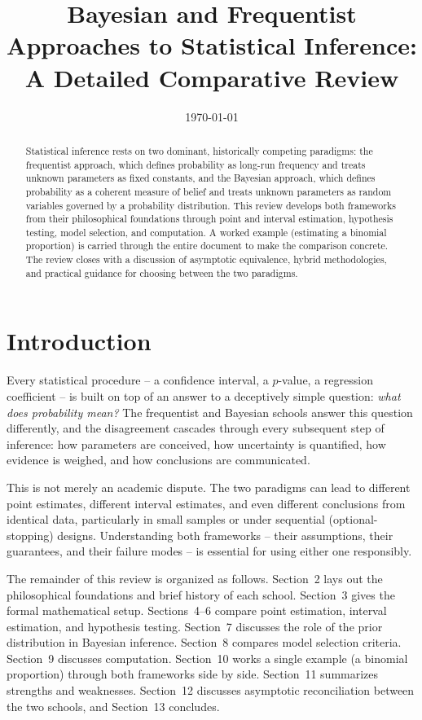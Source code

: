 \documentclass[11pt,a4paper]{article}
\title{\textbf{Bayesian and Frequentist Approaches to Statistical Inference:\\ A Detailed Comparative Review}}
\author{}
\date{\today}
\begin{document}
\maketitle

\begin{abstract}
\noindent Statistical inference rests on two dominant, historically competing paradigms: the frequentist approach, which defines probability as long-run frequency and treats unknown parameters as fixed constants, and the Bayesian approach, which defines probability as a coherent measure of belief and treats unknown parameters as random variables governed by a probability distribution. This review develops both frameworks from their philosophical foundations through point and interval estimation, hypothesis testing, model selection, and computation. A worked example (estimating a binomial proportion) is carried through the entire document to make the comparison concrete. The review closes with a discussion of asymptotic equivalence, hybrid methodologies, and practical guidance for choosing between the two paradigms.
\end{abstract}

\tableofcontents

\section{Introduction}
Every statistical procedure -- a confidence interval, a $p$-value, a regression coefficient -- is built on top of an answer to a deceptively simple question: \emph{what does probability mean?} The frequentist and Bayesian schools answer this question differently, and the disagreement cascades through every subsequent step of inference: how parameters are conceived, how uncertainty is quantified, how evidence is weighed, and how conclusions are communicated.

This is not merely an academic dispute. The two paradigms can lead to different point estimates, different interval estimates, and even different conclusions from identical data, particularly in small samples or under sequential (optional-stopping) designs. Understanding both frameworks -- their assumptions, their guarantees, and their failure modes -- is essential for using either one responsibly.

The remainder of this review is organized as follows. Section~2 lays out the philosophical foundations and brief history of each school. Section~3 gives the formal mathematical setup. Sections~4--6 compare point estimation, interval estimation, and hypothesis testing. Section~7 discusses the role of the prior distribution in Bayesian inference. Section~8 compares model selection criteria. Section~9 discusses computation. Section~10 works a single example (a binomial proportion) through both frameworks side by side. Section~11 summarizes strengths and weaknesses. Section~12 discusses asymptotic reconciliation between the two schools, and Section~13 concludes.
\end{document}
